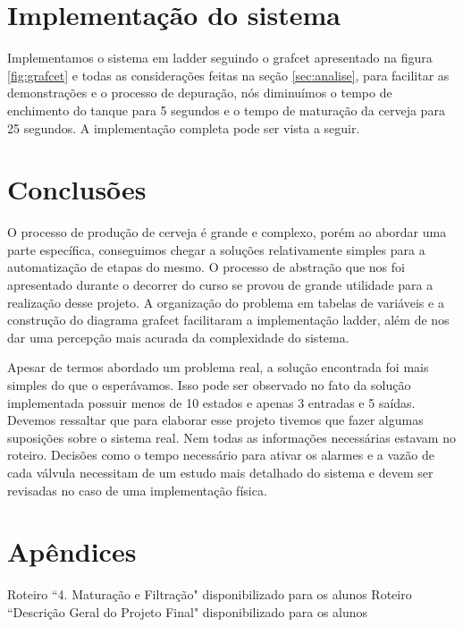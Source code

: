 \documentclass[12pt]{article}
\begin{document}
\section {Implementação do sistema}
\label{sec:ladder}
Implementamos o sistema em ladder seguindo o grafcet apresentado na figura \ref{fig:grafcet} e todas as considerações feitas na seção \ref{sec:analise}, para facilitar as demonstrações e o processo de depuração, nós diminuímos o tempo de enchimento do tanque para 5 segundos e o tempo de maturação da cerveja para 25 segundos. A implementação completa pode ser vista a seguir.



\section {Conclusões}
O processo de produção de cerveja é grande e complexo, porém ao abordar uma parte específica, conseguimos chegar a soluções relativamente simples para a automatização de etapas do mesmo. O processo de abstração que nos foi apresentado durante o decorrer do curso se provou de grande utilidade para a realização desse projeto. A organização do problema em tabelas de variáveis e a construção do diagrama grafcet facilitaram a implementação ladder, além de nos dar uma percepção mais acurada da complexidade do sistema.

Apesar de termos abordado um problema real, a solução encontrada foi mais simples do que o esperávamos. Isso pode ser observado no fato da solução implementada possuir menos de 10 estados e apenas 3 entradas e 5 saídas. Devemos ressaltar que para elaborar esse projeto tivemos que fazer algumas suposições sobre o sistema real. Nem todas as informações necessárias estavam no roteiro. Decisões como o tempo necessário para ativar os alarmes e a vazão de cada válvula necessitam de um estudo mais detalhado do sistema e devem ser revisadas no caso de uma implementação física.
\newpage
\appendix
\section{Apêndices}

\label{apx:table}


\label{apx:ihm}


\begin{thebibliography}{5}
	 Roteiro ``4. Maturação e Filtração" disponibilizado para os alunos
	 Roteiro ``Descrição Geral do Projeto Final" disponibilizado para os alunos
\end{thebibliography}
\end{document}
